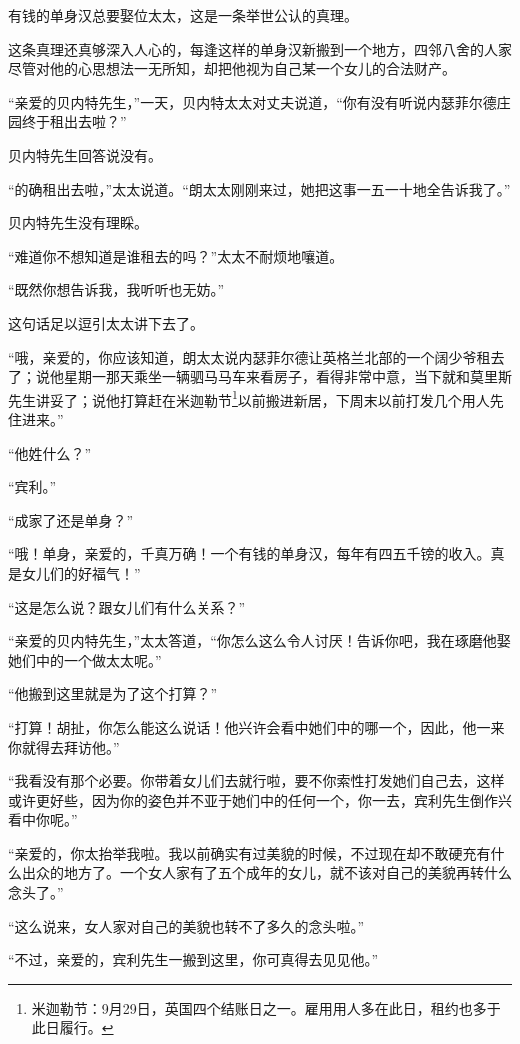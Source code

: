 \par 有钱的单身汉总要娶位太太，这是一条举世公认的真理。
\par 这条真理还真够深入人心的，每逢这样的单身汉新搬到一个地方，四邻八舍的人家尽管对他的心思想法一无所知，却把他视为自己某一个女儿的合法财产。
\par “亲爱的贝内特先生，”一天，贝内特太太对丈夫说道，“你有没有听说内瑟菲尔德庄园终于租出去啦？”
\par 贝内特先生回答说没有。
\par “的确租出去啦，”太太说道。“朗太太刚刚来过，她把这事一五一十地全告诉我了。”
\par 贝内特先生没有理睬。
\par “难道你不想知道是谁租去的吗？”太太不耐烦地嚷道。
\par “既然你想告诉我，我听听也无妨。”
\par 这句话足以逗引太太讲下去了。
\par “哦，亲爱的，你应该知道，朗太太说内瑟菲尔德让英格兰北部的一个阔少爷租去了；说他星期一那天乘坐一辆驷马马车来看房子，看得非常中意，当下就和莫里斯先生讲妥了；说他打算赶在米迦勒节\footnote{米迦勒节：9月29日，英国四个结账日之一。雇用用人多在此日，租约也多于此日履行。}以前搬进新居，下周末以前打发几个用人先住进来。”
\par “他姓什么？”
\par “宾利。”
\par “成家了还是单身？”
\par “哦！单身，亲爱的，千真万确！一个有钱的单身汉，每年有四五千镑的收入。真是女儿们的好福气！”
\par “这是怎么说？跟女儿们有什么关系？”
\par “亲爱的贝内特先生，”太太答道，“你怎么这么令人讨厌！告诉你吧，我在琢磨他娶她们中的一个做太太呢。”
\par “他搬到这里就是为了这个打算？”
\par “打算！胡扯，你怎么能这么说话！他兴许会看中她们中的哪一个，因此，他一来你就得去拜访他。”
\par “我看没有那个必要。你带着女儿们去就行啦，要不你索性打发她们自己去，这样或许更好些，因为你的姿色并不亚于她们中的任何一个，你一去，宾利先生倒作兴看中你呢。”
\par “亲爱的，你太抬举我啦。我以前确实有过美貌的时候，不过现在却不敢硬充有什么出众的地方了。一个女人家有了五个成年的女儿，就不该对自己的美貌再转什么念头了。”
\par “这么说来，女人家对自己的美貌也转不了多久的念头啦。”
\par “不过，亲爱的，宾利先生一搬到这里，你可真得去见见他。”
